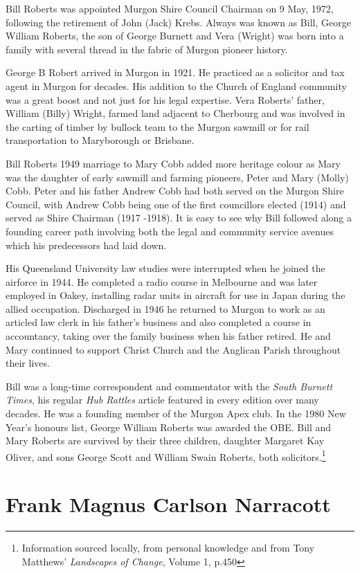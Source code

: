 Bill Roberts was appointed Murgon Shire Council Chairman on 9 May, 1972, following the retirement of John (Jack) Krebs. Always was known as Bill, George William Roberts, the son of George Burnett and Vera (Wright) was born into a family with several thread in the fabric of Murgon pioneer history.

George B Robert arrived in Murgon in 1921. He practiced as a solicitor and tax agent in Murgon for decades. His addition to the Church of England community was a great boost and not just for his legal expertise. Vera Roberts' father, William (Billy) Wright, farmed land adjacent to Cherbourg and was involved in the carting of timber by bullock team to the Murgon sawmill or for rail transportation to Maryborough or Brisbane.

Bill Roberts 1949 marriage to Mary Cobb added more heritage colour as Mary was the daughter of early sawmill and farming pioneers, Peter and Mary (Molly) Cobb. Peter and his father Andrew Cobb had both served on the Murgon Shire Council, with Andrew Cobb being one of the first councillors elected (1914) and served as Shire Chairman (1917 -1918). It is easy to see why Bill followed along a founding career path involving both the legal and community service avenues which his predecessors had laid down.

His Queensland University law studies were interrupted when he joined the airforce in 1944. He completed a radio course in Melbourne and was later employed in Oakey, installing radar units in aircraft for use in Japan during the allied occupation. Discharged in 1946 he returned to Murgon to work as an articled law clerk in his father's business and also completed a course in accountancy, taking over the family business when his father retired. He and Mary continued to support Christ Church and the Anglican Parish throughout their lives.

Bill was a long-time correspondent and commentator with the \emph{South Burnett Times}, his regular \emph{Hub Rattles} article featured in every edition over many decades. He was a founding member of the Murgon Apex club. In the 1980 New Year's honours list, George William Roberts was awarded the OBE. Bill and Mary Roberts are survived by their three children, daughter Margaret Kay Oliver, and sons George Scott and William Swain Roberts, both solicitors.\footnote{Information sourced locally, from personal knowledge and from Tony Matthews' \emph{Landscapes of Change}, Volume 1, p.450}

\hypertarget{frank-magnus-carlson-narracott}{%
\section{Frank Magnus Carlson Narracott}\label{frank-magnus-carlson-narracott}}

